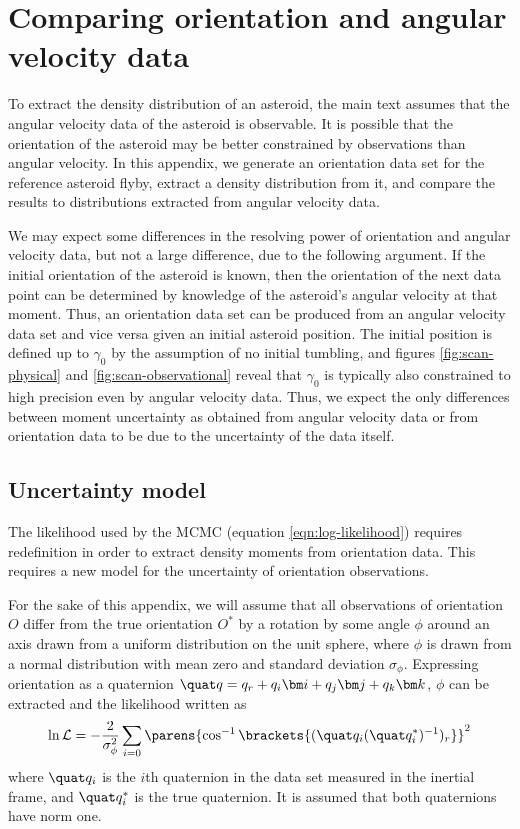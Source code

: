 \section{Comparing orientation and angular velocity data}

To extract the density distribution of an asteroid, the main text assumes that the angular velocity data of the asteroid is observable. It is possible that the orientation of the asteroid may be better constrained by observations than angular velocity. In this appendix, we generate an orientation data set for the reference asteroid flyby, extract a density distribution from it, and compare the results to distributions extracted from angular velocity data.

We may expect some differences in the resolving power of orientation and angular velocity data, but not a large difference, due to the following argument. If the initial orientation of the asteroid is known, then the orientation of the next data point can be determined by knowledge of the asteroid's angular velocity at that moment. Thus, an orientation data set can be produced from an angular velocity data set and vice versa given an initial asteroid position. The initial position is defined up to $\gamma_0$ by the assumption of no initial tumbling, and figures \ref{fig:scan-physical} and \ref{fig:scan-observational} reveal that $\gamma_0$ is typically also constrained to high precision even by angular velocity data. Thus, we expect the only differences between moment uncertainty as obtained from angular velocity data or from orientation data to be due to the uncertainty of the data itself.

\subsection{Uncertainty model}
The likelihood used by the MCMC (equation \ref{eqn:log-likelihood}) requires redefinition in order to extract density moments from orientation data. This requires a new model for the uncertainty of orientation observations.

For the sake of this appendix, we will assume that all observations of orientation $O$ differ from the true orientation $O^*$ by a rotation by some angle $\phi$ around an axis drawn from a uniform distribution on the unit sphere, where $\phi$ is drawn from a normal distribution with mean zero and standard deviation $\sigma_\phi$. Expressing orientation as a quaternion $\quat q = q_r + q_i \bm i + q_j \bm j + q_k \bm k$, $\phi$ can be extracted and the likelihood written as 
\begin{equation}
  \ln \mathcal{L} = -\frac{2}{\sigma_\phi^2}\sum_{i=0}\parens{\cos^{-1}\brackets{(\quat q_i (\quat q_i^*)^{-1})_r}}^2
  \label{eqn:orientation-like}
\end{equation}
where $\quat q_i$ is the $i$th quaternion in the data set measured in the inertial frame, and $\quat q_i^*$ is the true quaternion. It is assumed that both quaternions have norm one.

